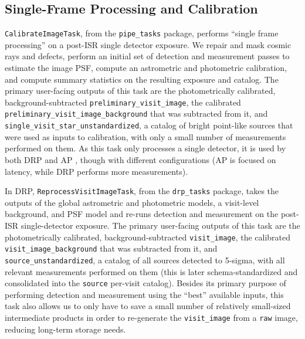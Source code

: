 \subsection{Single-Frame Processing and Calibration}
\label{sec:sfp}

\texttt{CalibrateImageTask}, from the \texttt{pipe\_tasks} package, performs ``single frame processing'' on a post-ISR  single detector exposure.
We repair and mask cosmic rays and defects, perform an initial set of detection  and measurement  passes to estimate the image PSF, compute an astrometric  and photometric  calibration, and compute summary statistics on the resulting exposure and catalog.
The primary user-facing outputs of this task are the photometrically calibrated, background-subtracted \texttt{preliminary\_\-visit\_\-image}, the calibrated \texttt{preliminary\_\-visit\_\-image\_\-background} that was subtracted from it, and \texttt{single\_\-visit\_\-star\_\-unstandardized}, a catalog of bright point-like sources that were used as inputs to calibration, with only a small number of measurements performed on them.
As this task only processes a single detector, it is used by both DRP  and AP , though with different configurations (AP is focused on latency, while DRP performs more measurements).

In DRP, \texttt{ReprocessVisitImageTask}, from the \texttt{drp\_tasks} package, takes the outputs of the global astrometric and photometric models, a visit-level background, and PSF model and re-runs detection and measurement on the post-ISR single-detector exposure.
The primary user-facing outputs of this task are the photometrically calibrated, background-subtracted \texttt{visit\_image}, the calibrated \texttt{visit\_image\_background} that was subtracted from it, and \texttt{source\_unstandardized}, a catalog of all sources detected to 5-sigma, with all relevant measurements performed on them (this is later schema-standardized and consolidated into the \texttt{source} per-visit catalog).
Besides its primary purpose of performing detection and measurement using the ``best'' available inputs, this task also allows us to only have to save a small number of relatively small-sized intermediate products in order to re-generate the \texttt{visit\_image} from a \texttt{raw} image, reducing long-term storage needs.
